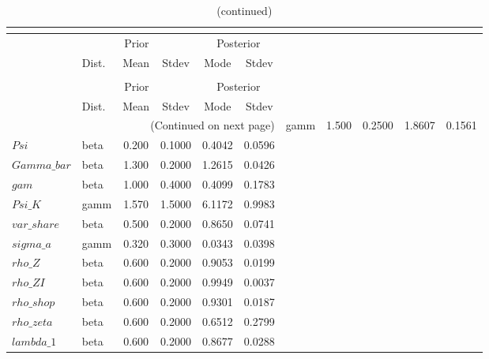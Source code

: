  
\begin{center}
\begin{longtable}{llcccc} 
\caption{Results from posterior maximization (parameters)}\\
 \label{Table:Posterior:1}\\
\toprule 
  & \multicolumn{3}{c}{Prior}  &  \multicolumn{2}{c}{Posterior} \\
  \cmidrule(r{.75em}){2-4} \cmidrule(r{.75em}){5-6}
  & Dist. & Mean  & Stdev & Mode & Stdev \\ 
\midrule \endfirsthead 
\caption{(continued)}\\
 \bottomrule 
  & \multicolumn{3}{c}{Prior}  &  \multicolumn{2}{c}{Posterior} \\
  \cmidrule(r{.75em}){2-4} \cmidrule(r{.75em}){5-6}
  & Dist. & Mean  & Stdev & Mode & Stdev \\ 
\midrule \endhead 
\bottomrule \multicolumn{6}{r}{(Continued on next page)}\endfoot 
\bottomrule\endlastfoot 
$sigma$ & gamm &   1.500 & 0.2500 &   1.8607 &  0.1561 \\ 
$Psi$ & beta &   0.200 & 0.1000 &   0.4042 &  0.0596 \\ 
$Gamma\_bar$ & beta &   1.300 & 0.2000 &   1.2615 &  0.0426 \\ 
$gam$ & beta &   1.000 & 0.4000 &   0.4099 &  0.1783 \\ 
$Psi\_K$ & gamm &   1.570 & 1.5000 &   6.1172 &  0.9983 \\ 
$var\_share$ & beta &   0.500 & 0.2000 &   0.8650 &  0.0741 \\ 
$sigma\_a$ & gamm &   0.320 & 0.3000 &   0.0343 &  0.0398 \\ 
$rho\_Z$ & beta &   0.600 & 0.2000 &   0.9053 &  0.0199 \\ 
$rho\_ZI$ & beta &   0.600 & 0.2000 &   0.9949 &  0.0037 \\ 
$rho\_shop$ & beta &   0.600 & 0.2000 &   0.9301 &  0.0187 \\ 
$rho\_zeta$ & beta &   0.600 & 0.2000 &   0.6512 &  0.2799 \\ 
$lambda\_1$ & beta &   0.600 & 0.2000 &   0.8677 &  0.0288 \\ 
\end{longtable}
 \end{center}
